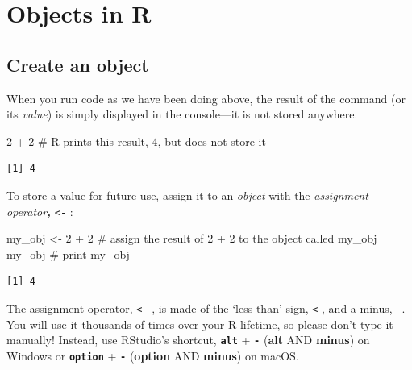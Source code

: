 \documentclass[
  letterpaper,
  DIV=11,
  numbers=noendperiod]{scrreprt}
\newenvironment{Shaded}{\begin{snugshade}}{\end{snugshade}}
\newcommand{\CommentTok}[1]{\textcolor[rgb]{0.37,0.37,0.37}{#1}}
\newcommand{\DecValTok}[1]{\textcolor[rgb]{0.68,0.00,0.00}{#1}}
\newcommand{\NormalTok}[1]{\textcolor[rgb]{0.00,0.23,0.31}{#1}}
\newcommand{\OtherTok}[1]{\textcolor[rgb]{0.00,0.23,0.31}{#1}}
\newcommand{\SpecialCharTok}[1]{\textcolor[rgb]{0.37,0.37,0.37}{#1}}
\begin{document}
\hypertarget{objects-in-r}{%
\section{Objects in R}\label{objects-in-r}}

\hypertarget{create-an-object}{%
\subsection{Create an object}\label{create-an-object}}

When you run code as we have been doing above, the result of the command
(or its \emph{value}) is simply displayed in the console---it is not
stored anywhere.

\begin{Shaded}
\begin{Highlighting}[]
\DecValTok{2} \SpecialCharTok{+} \DecValTok{2} \CommentTok{\# R prints this result, 4, but does not store it }
\end{Highlighting}
\end{Shaded}

\begin{verbatim}
[1] 4
\end{verbatim}

To store a value for future use, assign it to an \emph{object} with the
\emph{assignment operator\textbf{,}} \texttt{\textless{}-} :

\begin{Shaded}
\begin{Highlighting}[]
\NormalTok{my\_obj }\OtherTok{\textless{}{-}} \DecValTok{2} \SpecialCharTok{+} \DecValTok{2} \CommentTok{\# assign the result of \textasciigrave{}2 + 2 \textasciigrave{} to the object called \textasciigrave{}my\_obj\textasciigrave{}}
\NormalTok{my\_obj }\CommentTok{\# print my\_obj}
\end{Highlighting}
\end{Shaded}

\begin{verbatim}
[1] 4
\end{verbatim}

The assignment operator, \texttt{\textless{}-} , is made of the `less
than' sign, \texttt{\textless{}} , and a minus, \texttt{-}. You will use
it thousands of times over your R lifetime, so please don't type it
manually! Instead, use RStudio's shortcut, \textbf{\texttt{alt}} +
\textbf{\texttt{-}} (\textbf{alt} AND \textbf{minus}) on Windows or
\textbf{\texttt{option}} + \textbf{\texttt{-}} (\textbf{option} AND
\textbf{minus}) on macOS.
\end{document}
